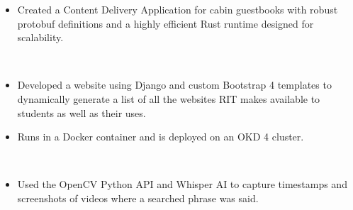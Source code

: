 \documentclass[11pt,letterpaper,ragged2e]{altacv}
\begin{document}
\vspace{6pt} %

{
\begin{itemize}
  \item Created a Content Delivery Application for cabin guestbooks with robust protobuf definitions and a highly efficient Rust runtime designed for scalability.
\end{itemize}
}
{} \
\medskip

{
\begin{itemize}
    \item Developed a website using Django and custom Bootstrap 4 templates to dynamically generate a list of all the websites RIT makes available to students as well as their uses.
    \item Runs in a Docker container and is deployed on an OKD 4 cluster.
\end{itemize}
}
{} \
\medskip


{
\begin{itemize}
    \item Used the OpenCV Python API and Whisper AI to capture timestamps and screenshots of videos where a searched phrase was said.
\end{itemize}
}
{} \

{} \

\clearpage

\nocite{*}
\end{document}
